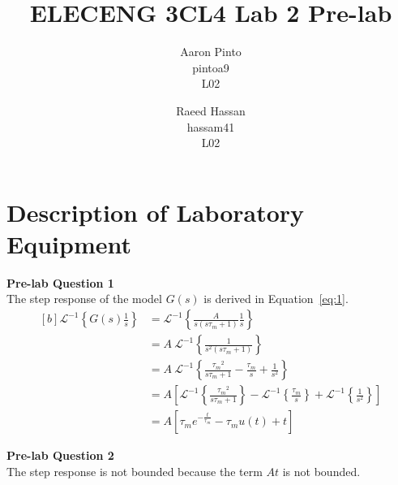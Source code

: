 \documentclass[12pt]{article}
\title{ELECENG 3CL4 Lab 2 Pre-lab}
\author{
    Aaron Pinto \\
    pintoa9 \\
    L02
    \and
    Raeed Hassan \\
    hassam41 \\
    L02
}
\begin{document}
\maketitle
\clearpage

\section{Description of Laboratory Equipment}
\textbf{Pre-lab Question 1} \\ %
The step response of the model $G(s)$ is derived in Equation~\ref{eq:1}.
\begin{equation} \label{eq:1}
\begin{aligned}[b]
    \mathscr{L}^{-1} \left\{ G(s) \frac{1}{s} \right\} &= \mathscr{L}^{-1} \left\{ \frac{A} {s(s\tau_m + 1)} \frac{1}{s} \right\} \\
    &= A \ \mathscr{L}^{-1} \left\{ \frac{1} {s^2(s\tau_m + 1)} \right\} \\
    &= A \ \mathscr{L}^{-1} \left\{ \frac{{\tau_m}^2} {s\tau_m + 1} - \frac{\tau_m}{s} + \frac{1}{s^2} \right\} \\
    &= A \left[ \mathscr{L}^{-1} \left\{ \frac{{\tau_m}^2} {s\tau_m + 1} \right\} - \mathscr{L}^{-1} \left\{ \frac{\tau_m}{s} \right\} + \mathscr{L}^{-1} \left\{ \frac{1}{s^2} \right\} \right] \\
    &= A \left[ \tau_m e^{-\frac{t}{\tau_m}} - \tau_m u(t) + t \right]
\end{aligned}
\end{equation}

\textbf{Pre-lab Question 2} \\ %
The step response is not bounded because the term $At$ is not bounded.
\end{document}
